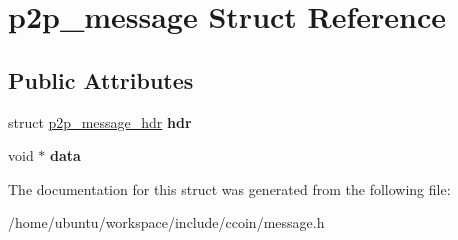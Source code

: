 \hypertarget{structp2p__message}{\section{p2p\-\_\-message Struct Reference}
\label{structp2p__message}
}
\subsection*{Public Attributes}
\begin{DoxyCompactItemize}
\item 
\hypertarget{structp2p__message_a62898b508b5fc50b46a0003e748fdda1}{struct \hyperlink{structp2p__message__hdr}{p2p\-\_\-message\-\_\-hdr} {\bfseries hdr}}\label{structp2p__message_a62898b508b5fc50b46a0003e748fdda1}

\item 
\hypertarget{structp2p__message_a26c660db217f66c4498510c0148ca4ad}{void $\ast$ {\bfseries data}}\label{structp2p__message_a26c660db217f66c4498510c0148ca4ad}

\end{DoxyCompactItemize}


The documentation for this struct was generated from the following file\-:\begin{DoxyCompactItemize}
\item 
/home/ubuntu/workspace/include/ccoin/message.\-h\end{DoxyCompactItemize}
